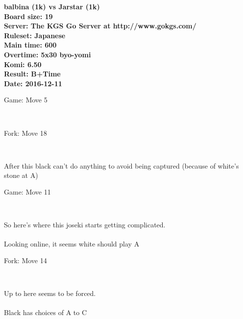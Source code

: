 \documentclass{article}
\begin{document}
\begin{titlepage}
    \null
    \vfill
    \begin{center}
        \textbf{balbina (1k) vs Jarstar (1k)}\\
        \textbf{Board size: 19}\\
        \textbf{Server: The KGS Go Server at http://www.gokgs.com/}\\
        \textbf{Ruleset: Japanese}\\
        \textbf{Main time: 600}\\
        \textbf{Overtime: 5x30 byo-yomi}\\
        \textbf{Komi: 6.50}\\
        \textbf{Result: B+Time}\\
        \textbf{Date: 2016-12-11}
    \end{center}
    \vfill
\end{titlepage}
\newpage
\tableofcontents
\newpage
\begin{section}{Game: Move 5}
\begin{center}
\cleargoban
{}
\showfullgoban
\\\parbox{4.5in}{
}
\end{center}
\end{section}
\begin{subsection}{Fork: Move 18}
\begin{center}
\cleargoban
{}
\showfullgoban
\\\parbox{4.5in}{
After this black can't do anything to avoid being captured (because of white's stone at A)}
\end{center}
\end{subsection}
\newpage
\begin{section}{Game: Move 11}
\begin{center}
\cleargoban
{}
\showfullgoban
\\\parbox{4.5in}{
So here's where this joseki starts getting complicated.\\\\Looking online, it seems white should play A}
\end{center}
\end{section}
\begin{subsection}{Fork: Move 14}
\begin{center}
\cleargoban
{}
\showfullgoban
\\\parbox{4.5in}{
Up to here seems to be forced.\\\\Black has choices of A to C}
\end{center}
\end{subsection}
\end{document}
